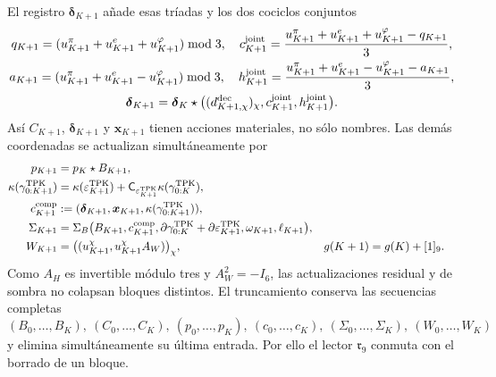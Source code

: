 El registro \(\boldsymbol\delta_{K+1}\) añade esas tríadas y los dos
cociclos conjuntos
\begin{equation}
\label{eq:continuo-comun-update-triadas-carry-conjunto}
 \begin{gathered}
 q_{K+1}=(u_{K+1}^\pi+u_{K+1}^e+u_{K+1}^\varphi)\bmod3,
 \quad
 c_{K+1}^{\rm joint}=\frac{u_{K+1}^\pi+u_{K+1}^e+u_{K+1}^\varphi-q_{K+1}}3,\\
 a_{K+1}=(u_{K+1}^\pi+u_{K+1}^e-u_{K+1}^\varphi)\bmod3,
 \quad
 h_{K+1}^{\rm joint}=\frac{u_{K+1}^\pi+u_{K+1}^e-u_{K+1}^\varphi-a_{K+1}}3,\\
 \boldsymbol\delta_{K+1}
 =\boldsymbol\delta_K\star
 \bigl((d_{K+1,\chi}^{\rm dec})_\chi,
       c_{K+1}^{\rm joint},h_{K+1}^{\rm joint}\bigr).
 \end{gathered}
\end{equation}
Así \(C_{K+1}\), \(\boldsymbol\delta_{K+1}\) y
\(\boldsymbol x_{K+1}\) tienen acciones materiales, no sólo nombres.
Las demás coordenadas se actualizan simultáneamente por
\begin{align}
 p_{K+1}&=p_K\star B_{K+1},
 \label{eq:continuo-comun-update-prefijo-tpk}\\
 \kappa(\gamma^{\rm TPK}_{0:K+1})
 &=\kappa(\varepsilon^{\rm TPK}_{K+1})
   +\mathsf C_{\varepsilon^{\rm TPK}_{K+1}}
    \kappa(\gamma^{\rm TPK}_{0:K}),
 \label{eq:continuo-comun-update-carry-lector-tpk}\\
 c_{K+1}^{\rm comp}
 &:=(\boldsymbol\delta_{K+1},\boldsymbol x_{K+1},
       \kappa(\gamma^{\rm TPK}_{0:K+1})),
 \label{eq:continuo-comun-update-carry-compacto-tpk}\\
 \Sigma_{K+1}
 &=\Sigma_B\bigl(
 B_{K+1},c_{K+1}^{\rm comp},
 \partial\gamma^{\rm TPK}_{0:K}
 +\partial\varepsilon^{\rm TPK}_{K+1},
 \omega_{K+1},\ell_{K+1}\bigr),
 \label{eq:continuo-comun-update-firma-tpk}\\
 W_{K+1}
 &=\bigl((u_{K+1}^\chi,u_{K+1}^\chi A_W)\bigr)_\chi,
 &g(K+1)&=g(K)+[1]_9.
 \label{eq:continuo-comun-update-witt-fase-tpk}
\end{align}
Como \(A_H\) es invertible módulo tres y \(A_W^2=-I_6\), las actualizaciones
residual y de sombra no colapsan bloques distintos. El truncamiento conserva
las secuencias completas
\[
 (B_0,\ldots,B_K),\ (C_0,\ldots,C_K),\
 (p_0,\ldots,p_K),\ (c_0,\ldots,c_K),\
 (\Sigma_0,\ldots,\Sigma_K),\ (W_0,\ldots,W_K)
\]
y elimina simultáneamente su última entrada. Por ello el lector
\(\mathfrak r_9\) conmuta con el borrado de un bloque.

